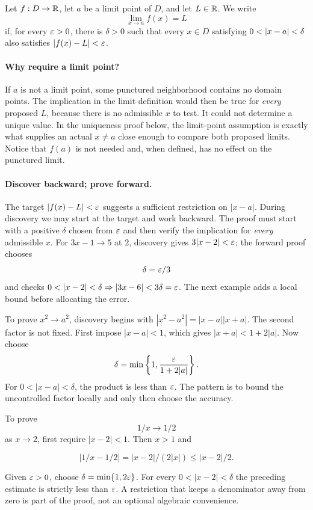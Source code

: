 \begin{definition}
\label{def:function-limit}
Let $f:D\to\mathbb{R}$, let $a$ be a limit point of $D$, and let $L\in\mathbb{R}$. We write
\[
\lim_{x\to a}f(x)=L
\]
if, for every $\varepsilon>0$, there is $\delta>0$ such that every $x\in D$ satisfying $0<\lvert x-a\rvert<\delta$ also satisfies $\lvert f(x)-L\rvert<\varepsilon$.
\end{definition}

\paragraph{Why require a limit point?}
If $a$ is not a limit point, some punctured neighborhood contains no domain
points. The implication in the limit definition would then be true for
\emph{every} proposed $L$, because there is no admissible $x$ to test.
It could not determine a unique value. In the uniqueness proof below,
the limit-point assumption is exactly what supplies an actual $x\ne a$
close enough to compare both proposed limits. Notice that $f(a)$ is not
needed and, when defined, has no effect on the punctured limit.

\paragraph{Discover backward; prove forward.}
The target $|f(x)-L|<\varepsilon$ suggests a sufficient restriction on
$|x-a|$. During discovery we may start at the target and work backward.
The proof must start with a positive $\delta$ chosen from $\varepsilon$ and
then verify the implication for \emph{every} admissible $x$.
For $3x-1\to5$ at $2$, discovery gives $3|x-2|<\varepsilon$;
the forward proof chooses
\[
\delta=\varepsilon/3
\]
 and checks
$0<|x-2|<\delta\Rightarrow |3x-6|<3\delta=\eps$.
The next example adds a local bound before allocating the error.

\begin{example}
To prove $x^2\to a^2$, discovery begins with
$|x^2-a^2|=|x-a||x+a|$. The second factor is not fixed. First impose
$|x-a|<1$, which gives $|x+a|<1+2|a|$. Now choose
\[
\delta=\min\left\{1,\frac{\varepsilon}{1+2|a|}\right\}.
\]
For $0<|x-a|<\delta$, the product is less than $\varepsilon$. The pattern is to bound
the uncontrolled factor locally and only then choose the accuracy.
\end{example}

\begin{example}
To prove
\[
1/x\to1/2
\]
 as $x\to2$, first require $|x-2|<1$.
Then $x>1$ and

\[
|1/x-1/2|=|x-2|/(2|x|)\leq|x-2|/2.
\]

Given $\varepsilon>0$, choose $\delta=\min\{1,2\varepsilon\}$. For every
$0<|x-2|<\delta$ the preceding estimate is strictly less than $\varepsilon$.
A restriction that keeps a denominator away from zero is part of the
proof, not an optional algebraic convenience.
\end{example}


